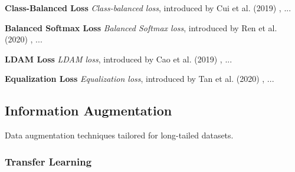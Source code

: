 



\myindent \textbf{Class-Balanced Loss} \textit{Class-balanced loss}, introduced by Cui et al. (2019) \cite{cui2019classbalancedlossbasedeffective}, ...

\myindent \textbf{Balanced Softmax Loss} \textit{Balanced Softmax loss}, introduced by Ren et al. (2020) \cite{ren2020balancedmetasoftmaxlongtailedvisual}, ...

\myindent \textbf{LDAM Loss} \textit{LDAM loss}, introduced by Cao et al. (2019) \cite{cao2019learningimbalanceddatasetslabeldistributionaware}, ...

\myindent \textbf{Equalization Loss} \textit{Equalization loss}, introduced by Tan et al. (2020) \cite{tan2020equalizationlosslongtailedobject}, ...


\subsection{Information Augmentation}
Data augmentation techniques tailored for long-tailed datasets.

\subsubsection{Transfer Learning}




